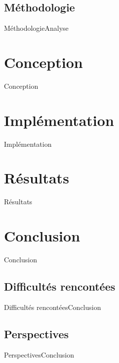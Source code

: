 \documentclass{beamer}
\begin{document}
  \subsection{Méthodologie}
    \begin{frame}{Méthodologie}{Analyse}
    \end{frame}

\section{Conception}
  \begin{frame}{Conception}
  \end{frame}

\section{Implémentation}
  \begin{frame}{Implémentation}
  \end{frame}

\section{Résultats}
  \begin{frame}{Résultats}
  \end{frame}

\section{Conclusion}
  \begin{frame}{Conclusion}
  \end{frame}

  \subsection{Difficultés rencontées}
    \begin{frame}{Difficultés rencontées}{Conclusion}
    \end{frame}

  \subsection{Perspectives}
    \begin{frame}{Perspectives}{Conclusion}
    \end{frame}
\end{document}
